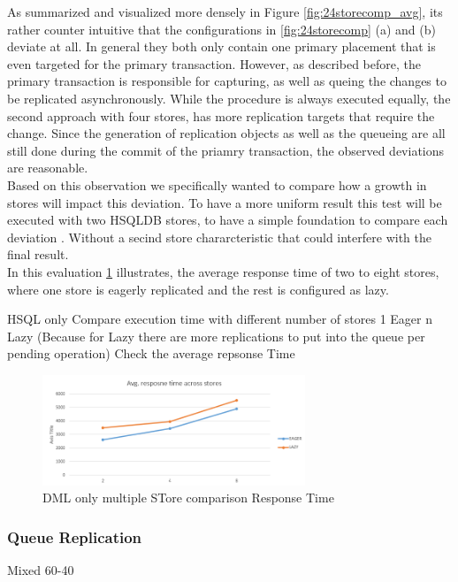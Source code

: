 As summarized and visualized more densely in Figure \ref{fig:24storecomp_avg},
its rather counter intuitive that the configurations in \ref{fig:24storecomp} (a) and (b) deviate at all. 
In general they both only contain one primary placement that is even targeted for the primary transaction. 
However, as described before, the primary transaction is responsible for capturing, as well as queing the changes to be replicated asynchronously.
While the procedure is always executed equally, the second approach with four stores, has more replication targets that require the change. 
Since the generation of replication objects as well as the queueing are all still done during the commit of the priamry transaction, the observed
deviations are reasonable.\\




Based on this observation we specifically wanted to compare how a growth in stores will impact this deviation.
To have a more uniform result this test will be executed with two HSQLDB stores, to have a simple foundation to compare each deviation .
Without a secind store chararcteristic that could interfere with the final result.\\
In this evaluation \ref{fig:stores_comp} illustrates, the average response time of two to eight stores, where one store is eagerly replicated and the rest
is configured as lazy.






HSQL only
Compare execution time with different number of stores 1 Eager n Lazy   
(Because for Lazy there 
are more replications to put into the queue per pending operation)
Check the average repsonse Time
\begin{figure}[t] 
    \centering 
    \includegraphics[width=0.7\textwidth]{Figures/hsql_avg_response_stores.PNG}
    \caption{DML only multiple STore comparison  Response Time}
    \label{fig:stores_comp}
\end{figure}


\subsubsection{Queue Replication}
Mixed 60-40

